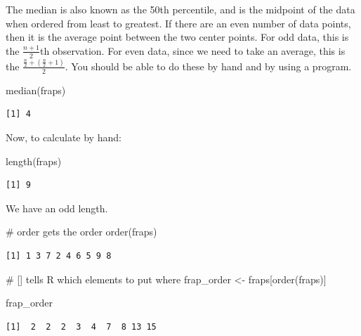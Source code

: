 \documentclass[
  letterpaper,
  DIV=11,
  numbers=noendperiod]{scrreprt}
\newenvironment{Shaded}{\begin{snugshade}}{\end{snugshade}}
\newcommand{\CommentTok}[1]{\textcolor[rgb]{0.37,0.37,0.37}{#1}}
\newcommand{\FunctionTok}[1]{\textcolor[rgb]{0.28,0.35,0.67}{#1}}
\newcommand{\NormalTok}[1]{\textcolor[rgb]{0.00,0.23,0.31}{#1}}
\newcommand{\OtherTok}[1]{\textcolor[rgb]{0.00,0.23,0.31}{#1}}
\begin{document}
The median is also known as the 50th percentile, and is the midpoint of
the data when ordered from least to greatest. If there are an even
number of data points, then it is the average point between the two
center points. For odd data, this is the \(\frac{n+1}{2}\)th
observation. For even data, since we need to take an average, this is
the \(\frac{\frac{n}{2}+(\frac{n}{2}+1)}{2}\). You should be able to do
these by hand and by using a program.

\begin{Shaded}
\begin{Highlighting}[]
\FunctionTok{median}\NormalTok{(fraps)}
\end{Highlighting}
\end{Shaded}

\begin{verbatim}
[1] 4
\end{verbatim}

Now, to calculate by hand:

\begin{Shaded}
\begin{Highlighting}[]
\FunctionTok{length}\NormalTok{(fraps)}
\end{Highlighting}
\end{Shaded}

\begin{verbatim}
[1] 9
\end{verbatim}

We have an odd length.

\begin{Shaded}
\begin{Highlighting}[]
\CommentTok{\# order gets the order}
\FunctionTok{order}\NormalTok{(fraps)}
\end{Highlighting}
\end{Shaded}

\begin{verbatim}
[1] 1 3 7 2 4 6 5 9 8
\end{verbatim}

\begin{Shaded}
\begin{Highlighting}[]
\CommentTok{\# [] tells R which elements to put where}
\NormalTok{frap\_order }\OtherTok{\textless{}{-}}\NormalTok{ fraps[}\FunctionTok{order}\NormalTok{(fraps)]}

\NormalTok{frap\_order}
\end{Highlighting}
\end{Shaded}

\begin{verbatim}
[1]  2  2  2  3  4  7  8 13 15
\end{verbatim}
\end{document}
